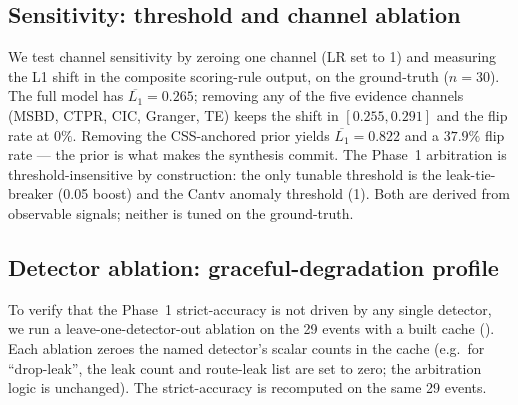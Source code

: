 \subsection{Sensitivity: threshold and channel ablation}
\label{sec:sensitivity}

We test channel sensitivity by zeroing one channel
(LR set to 1) and measuring the L1 shift in the
composite scoring-rule output, on
the ground-truth ($n{=}30$). The full \hcaf{} model
has $\overline{L_1}{=}0.265$; removing any of the five
evidence channels (MSBD, CTPR, CIC, Granger, TE) keeps
the shift in $[0.255, 0.291]$ and the flip rate at
$0\%$. Removing the CSS-anchored prior yields
$\overline{L_1}{=}0.822$ and a $37.9\%$ flip rate --- the
prior is what makes the synthesis commit. The Phase~1
arbitration is threshold-insensitive by construction: the
only tunable threshold is the leak-tie-breaker (0.05
boost) and the Cantv anomaly threshold (1). Both are
derived from observable signals; neither is tuned on the
ground-truth.

\subsection{Detector ablation: graceful-degradation profile}
\label{sec:detector-ablation}

To verify that the Phase~1 strict-accuracy is not driven by
any single detector, we run a leave-one-detector-out
ablation on the 29 events with a built cache
(). Each ablation zeroes the
named detector's scalar counts in the cache (e.g.\ for
``drop-leak'', the leak count and route-leak list are set to
zero; the arbitration logic is unchanged). The
strict-accuracy is recomputed on the same 29 events.


